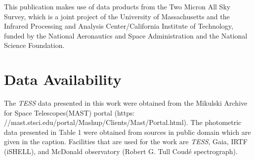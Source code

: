 \documentclass[fleqn,usenatbib]{mnras} %
\begin{document}
This publication makes use of data products from the Two Micron All Sky Survey, which is a joint project of the University of Massachusetts and the Infrared Processing and Analysis Center/California Institute of Technology, funded by the National Aeronautics and Space Administration and the National Science Foundation.


\section*{Data Availability}

The {\it TESS} data presented in this work were obtained from the Mikulski Archive for Space Telescopes(MAST) portal (https:
//mast.stsci.edu/portal/Mashup/Clients/Mast/Portal.html). The photometric data presented in Table 1 were obtained from sources in public domain which are given in the caption. Facilities that are used for the work are {\it TESS}, Gaia, IRTF (iSHELL), and McDonald observatory (Robert G. Tull Coud{\'e} spectrograph).






\end{document}
